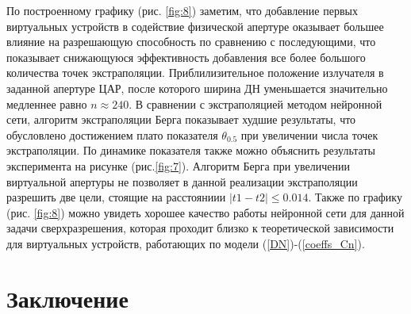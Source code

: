 \documentclass{article}
\begin{document}
	По построенному графику (рис. \ref{fig:8}) заметим, что добавление первых виртуальных устройств в содействие физической апертуре оказывает большее влияние на разрешающую способность по сравнению с последующими, что показывает снижающуюся эффективность добавления все более большого количества точек экстраполяции. Приблилизительное положение излучателя в заданной апертуре ЦАР, после которого ширина ДН уменьшается значительно медленнее равно $n \approx 240$. В сравнении с экстраполяцией методом нейронной сети, алгоритм экстраполяции Берга показывает худшие результаты, что обусловлено достижением плато показателя $\theta_{0.5}$ при увеличении числа точек экстраполяции. По динамике показателя также можно объяснить результаты эксперимента на рисунке (рис.\ref{fig:7}). Алгоритм Берга при увеличении виртуальной апертуры не позволяет в данной реализации экстраполяции разрешить две цели, стоящие на расстояниии $|t1 - t2| \le 0.014$. Также по графику (рис. \ref{fig:8}) можно увидеть хорошее качество работы нейронной сети для данной задачи сверхразрешения, которая проходит близко к теоретической зависимости для виртуальных устройств, работающих по модели (\ref{DN})-(\ref{coeffs_Cn}). 
	
	\section*{Заключение}
	
	
	\newpage
	
	
\end{document}
